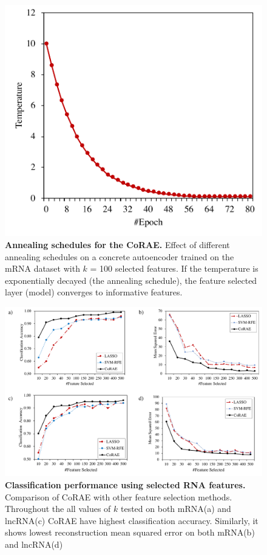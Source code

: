 \documentclass{bioinfo}
\begin{document}
\begin{figure}[h!]
    \centering
    \includegraphics[scale=0.45]{fig/temp-epoch-mRNA.pdf}
    \caption{\textbf{Annealing schedules for the CoRAE.} Effect of different annealing schedules on a concrete autoencoder trained on the mRNA dataset with $k$ = 100 selected features. If the temperature is exponentially decayed (the annealing schedule), the feature selected layer (model) converges to informative features.}
    \label{fig:temp}
\end{figure}
\begin{figure}[hbt]
    \centering
    \includegraphics[scale=0.5]{fig/acc-mse.pdf}
    \caption{\textbf{Classification performance using selected RNA features.}  Comparison of CoRAE with other feature selection methods. Throughout the all values of $k$ tested on both mRNA(a) and lncRNA(c) CoRAE have highest classification accuracy. Similarly, it shows lowest reconstruction mean squared error on both mRNA(b) and lncRNA(d)}
    \label{fig:acc-mse}
  \end{figure}
\end{document}
